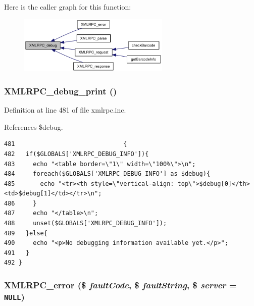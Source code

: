 Here is the caller graph for this function:\nopagebreak
\begin{figure}[H]
\begin{center}
\leavevmode
\includegraphics[width=205pt]{xmlrpc_8inc_e2d2e97a8c1c560f5e96d58d60a02874_icgraph}
\end{center}
\end{figure}
\hypertarget{xmlrpc_8inc_8467f85edd385ddf2506b1bd5065a6d7}{
\subsubsection{\setlength{\rightskip}{0pt plus 5cm}XMLRPC\_\-debug\_\-print ()}}
\label{xmlrpc_8inc_8467f85edd385ddf2506b1bd5065a6d7}




Definition at line 481 of file xmlrpc.inc.

References \$debug.

\begin{Code}\begin{verbatim}481                              {
482   if($GLOBALS['XMLRPC_DEBUG_INFO']){
483     echo "<table border=\"1\" width=\"100%\">\n";
484     foreach($GLOBALS['XMLRPC_DEBUG_INFO'] as $debug){
485       echo "<tr><th style=\"vertical-align: top\">$debug[0]</th><td>$debug[1]</td></tr>\n";
486     }
487     echo "</table>\n";
488     unset($GLOBALS['XMLRPC_DEBUG_INFO']);
489   }else{
490     echo "<p>No debugging information available yet.</p>";
491   }
492 }
\end{verbatim}
\end{Code}


\hypertarget{xmlrpc_8inc_0cdc54b1376ccbbe412175c9819a95ac}{
\subsubsection{\setlength{\rightskip}{0pt plus 5cm}XMLRPC\_\-error (\$ {\em faultCode}, \$ {\em faultString}, \$ {\em server} = {\tt NULL})}}
\label{xmlrpc_8inc_0cdc54b1376ccbbe412175c9819a95ac}




